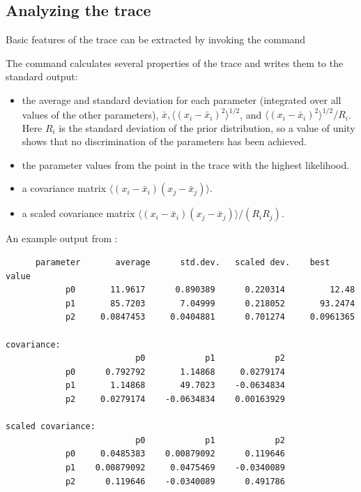 \subsection{Analyzing the trace}\label{subsec:AnalyzingTheTrace}

Basic features of the trace can be extracted by invoking the command


The command calculates several properties of the trace and writes them to the standard output:
\begin{itemize}\itemsep=0pt
\item the average and standard deviation for each parameter (integrated over all values of the other parameters), $\bar{x},\langle(x_i-\bar{x}_i)^2\rangle^{1/2}$, and $\langle(x_i-\bar{x}_i)^2\rangle^{1/2}/R_i$.
Here $R_i$ is the standard deviation of the prior distribution, so a value of unity shows that no discrimination of the parameters has been achieved.
\item the parameter values from the point in the trace with the highest likelihood.
\item a covariance matrix $\langle (x_i-\bar{x}_i)(x_j-\bar{x}_j)\rangle$.
\item a scaled covariance matrix $\langle (x_i-\bar{x}_i)(x_j-\bar{x}_j)\rangle/(R_iR_j)$.
\end{itemize}

An example output from :
\begin{verbatim}
      parameter       average      std.dev.   scaled dev.    best value
            p0       11.9617      0.890389      0.220314         12.48
            p1       85.7203       7.04999      0.218052       93.2474
            p2     0.0847453     0.0404881      0.701274     0.0961365

covariance:
                          p0            p1            p2
            p0      0.792792       1.14868     0.0279174
            p1       1.14868       49.7023    -0.0634834
            p2     0.0279174    -0.0634834    0.00163929

scaled covariance:
                          p0            p1            p2
            p0     0.0485383    0.00879092      0.119646
            p1    0.00879092     0.0475469    -0.0340089
            p2      0.119646    -0.0340089      0.491786
\end{verbatim}

